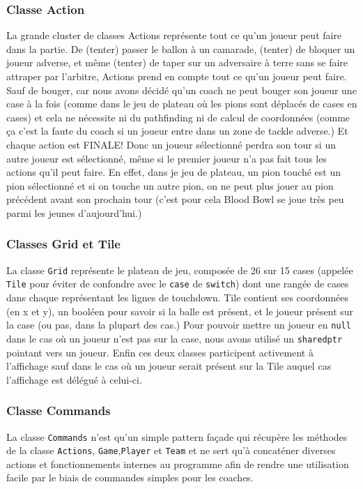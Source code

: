 \documentclass{article}
\newcommand{\info}{\texttt}
\begin{document}
        \subsubsection{Classe Action}
        
            La grande cluster de classes Actions représente tout ce qu'un joueur peut faire dans la partie. De (tenter) passer le ballon à un camarade, (tenter) de bloquer un joueur adverse, et même (tenter) de taper sur un adversaire à terre sans se faire attraper par l'arbitre, Actions prend en compte tout ce qu'un joueur peut faire. Sauf de bouger, car nous avons décidé qu'un coach ne peut bouger son joueur une case à la fois (comme dans le jeu de plateau où les pions sont déplacés de cases en cases) et cela ne nécessite ni du pathfinding ni de calcul de coordonnées (comme ça c'est la faute du coach si un joueur entre dans un zone de tackle adverse.) Et chaque action est FINALE! Donc un joueur sélectionné perdra son tour si un autre joueur est sélectionné, même si le premier joueur n'a pas fait tous les actions qu'il peut faire. En effet, dans je jeu de plateau, un pion touché est un pion sélectionné et si on touche un autre pion, on ne peut plus jouer au pion précédent avant son prochain tour (c'est pour cela Blood Bowl se joue très peu parmi les jeunes d'aujourd'hui.)
        
        \subsubsection{Classes Grid et Tile}
        
            La classe \info{Grid} représente le plateau de jeu, composée de 26 sur 15 cases (appelée  \info{Tile} pour éviter de confondre avec le \info{case} de \info{switch}) dont une rangée de cases dans chaque représentant les lignes de touchdown. Tile contient ses coordonnées (en x et y), un booléen pour savoir si la balle est présent, et le joueur présent sur la case (ou pas, dans la plupart des cas.) Pour pouvoir mettre un joueur en \info{null} dans le cas où un joueur n'est pas sur la case, nous avons utilisé un \info{sharedptr} pointant vers un joueur. Enfin ces deux classes participent activement à l'affichage sauf dans le cas où un joueur serait présent sur la Tile auquel cas l'affichage est délégué à celui-ci.
        
        \subsubsection{Classe Commands}
            La classe \info{Commands} n'est qu'un simple pattern façade qui récupère les méthodes de la classe \info{Actions}, \info{Game},\info{Player} et \info{Team} et ne sert qu'à concaténer diverses actions et fonctionnements internes au programme afin de rendre une utilisation facile par le biais de commandes simples pour les coaches. 
        
\end{document}
